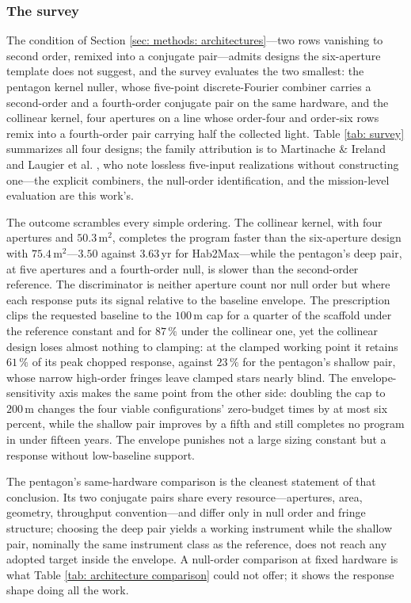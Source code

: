 \documentclass[12pt,a4paper]{article}
\numberwithin{equation}{section}
\numberwithin{figure}{section}
\numberwithin{table}{section}
\begin{document}
\subsubsection*{The survey}
The condition of Section \ref{sec: methods: architectures}---two rows vanishing to second order, remixed into a conjugate pair---admits designs the six-aperture template does not suggest, and the survey evaluates the two smallest: the pentagon kernel nuller, whose five-point discrete-Fourier combiner carries a second-order and a fourth-order conjugate pair on the same hardware, and the collinear kernel, four apertures on a line whose order-four and order-six rows remix into a fourth-order pair carrying half the collected light. Table \ref{tab: survey} summarizes all four designs; the family attribution is to Martinache \& Ireland \cite{martinache2018kernel} and Laugier et al. \cite{laugier2020kernel}, who note lossless five-input realizations without constructing one---the explicit combiners, the null-order identification, and the mission-level evaluation are this work's.


The outcome scrambles every simple ordering. The collinear kernel, with four apertures and $50.3$\,m$^2$, completes the program faster than the six-aperture design with $75.4$\,m$^2$---$3.50$ against $3.63$\,yr for Hab2Max---while the pentagon's deep pair, at five apertures and a fourth-order null, is slower than the second-order reference. The discriminator is neither aperture count nor null order but where each response puts its signal relative to the baseline envelope. The prescription clips the requested baseline to the $100$\,m cap for a quarter of the scaffold under the reference constant and for $87\,\%$ under the collinear one, yet the collinear design loses almost nothing to clamping: at the clamped working point it retains $61\,\%$ of its peak chopped response, against $23\,\%$ for the pentagon's shallow pair, whose narrow high-order fringes leave clamped stars nearly blind. The envelope-sensitivity axis makes the same point from the other side: doubling the cap to $200$\,m changes the four viable configurations' zero-budget times by at most six percent, while the shallow pair improves by a fifth and still completes no program in under fifteen years. The envelope punishes not a large sizing constant but a response without low-baseline support.

The pentagon's same-hardware comparison is the cleanest statement of that conclusion. Its two conjugate pairs share every resource---apertures, area, geometry, throughput convention---and differ only in null order and fringe structure; choosing the deep pair yields a working instrument while the shallow pair, nominally the same instrument class as the reference, does not reach any adopted target inside the envelope. A null-order comparison at fixed hardware is what Table \ref{tab: architecture comparison} could not offer; it shows the response shape doing all the work.
\end{document}
